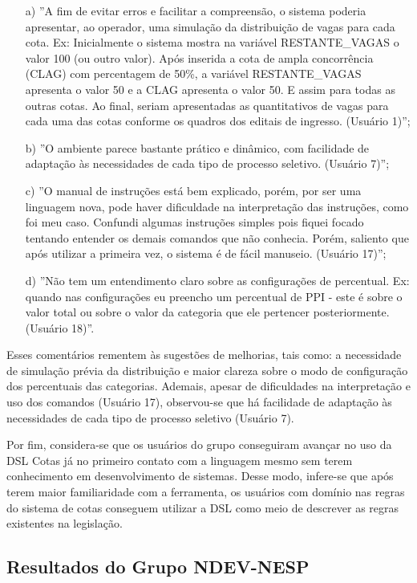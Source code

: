 \begin{enumerate}
    \item [a)] ''A fim de evitar erros e facilitar a compreensão, o sistema poderia apresentar, ao operador, uma simulação da distribuição de vagas para cada cota. Ex: Inicialmente o sistema mostra na variável RESTANTE\_VAGAS o valor 100 (ou outro valor). Após inserida a cota de ampla concorrência (CLAG) com percentagem de 50\%, a variável RESTANTE\_VAGAS apresenta o valor 50 e a CLAG apresenta o valor 50. E assim para todas as outras cotas. Ao final, seriam apresentadas as quantitativos de vagas para cada uma das cotas conforme os quadros dos editais de ingresso. (Usuário 1)'';
    \item [b)] ''O ambiente parece bastante prático e dinâmico, com facilidade de adaptação às necessidades de cada tipo de processo seletivo. (Usuário 7)'';    
    \item [c)] ''O manual de instruções está bem explicado, porém, por ser uma linguagem nova, pode haver dificuldade na interpretação das instruções, como foi meu caso. Confundi algumas instruções simples pois fiquei focado tentando entender os demais comandos que não conhecia. Porém, saliento que após utilizar a primeira vez, o sistema é de fácil manuseio. (Usuário 17)'';   
    \item [d)] ''Não tem um entendimento claro sobre as configurações de percentual. Ex: quando nas configurações eu preencho um percentual de PPI -  este é sobre o valor total ou sobre o valor da categoria que ele pertencer posteriormente. (Usuário 18)''.
\end{enumerate}

Esses comentários rementem às sugestões de melhorias, tais como: a necessidade de simulação prévia da distribuição e maior clareza sobre o modo de configuração dos percentuais das categorias. Ademais, apesar de dificuldades na interpretação e uso dos comandos (Usuário 17), observou-se que há facilidade de adaptação às necessidades de cada tipo de processo seletivo (Usuário 7).

Por fim, considera-se que os usuários do grupo conseguiram avançar no uso da DSL Cotas já no primeiro contato com a linguagem mesmo sem terem conhecimento em desenvolvimento de sistemas. Desse modo, infere-se que após terem maior familiaridade com a ferramenta, os usuários com domínio nas regras do sistema de cotas conseguem utilizar a DSL como meio de descrever as regras existentes na legislação.


\subsection{Resultados do Grupo NDEV-NESP}
\label{subsec:ndevnesp}

